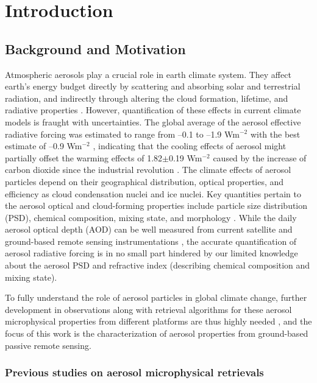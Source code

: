 \chapter{Introduction}

\section{Background and Motivation}

Atmospheric aerosols play a crucial role in earth climate system. They
affect earth's energy budget directly by scattering and absorbing solar and
terrestrial radiation, and indirectly through altering the cloud formation,
lifetime, and radiative properties \citep{Haywood00,Ramanathan01}.
However, quantification of these effects in current climate models is fraught
with uncertainties. The global average of the aerosol effective radiative 
forcing was estimated to range from --0.1 to --1.9 Wm$^{-2}$ with the best 
estimate of --0.9 Wm$^{-2}$ \citep{Boucher13}, indicating that the cooling
effects of aerosol might partially offset the warming effects of 1.82$\pm$0.19
Wm$^{-2}$ caused by the increase of carbon dioxide since the industrial 
revolution \citep{Myhre13}. The climate effects of aerosol particles depend 
on their geographical distribution, optical properties, and efficiency as 
cloud condensation nuclei and ice nuclei. 
Key quantities pertain to the aerosol optical and
cloud-forming properties include particle size distribution (PSD), chemical
composition, mixing state, and morphology \citep{Boucher13}. While the
daily aerosol optical depth (AOD) can be well measured from current satellite
and ground-based remote sensing instrumentations \citep[e.g.,][]{Holben98,Kaufman02},
the accurate quantification of aerosol radiative forcing is in no
small part hindered by our limited knowledge about the aerosol PSD and
refractive index (describing chemical composition and mixing state). 

To fully understand the role of aerosol particles in global climate change, 
further development in observations along with retrieval algorithms for these
aerosol microphysical properties from different platforms are thus highly
needed \citep{Mishchenko04}, and the focus of this work
is the characterization of aerosol properties from ground-based passive remote
sensing.

\subsection{Previous studies on aerosol microphysical retrievals}

